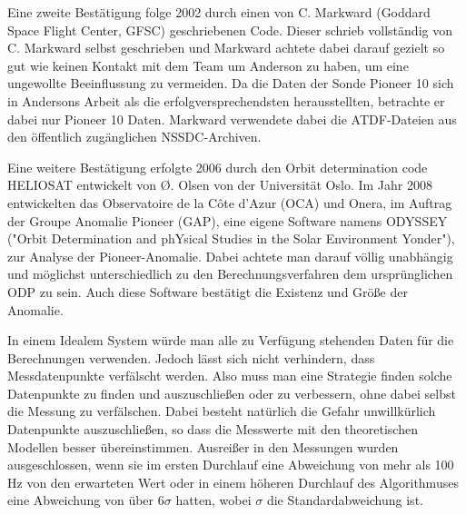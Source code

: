 Eine zweite Bestätigung folge 2002 durch einen von C. Markward (Goddard Space Flight Center, GFSC) geschriebenen
Code. Dieser schrieb vollständig von C. Markward selbst geschrieben und Markward achtete dabei darauf gezielt so gut wie keinen Kontakt mit dem Team um Anderson zu haben, um eine ungewollte Beeinflussung zu vermeiden.\cite{Markwardt2002} Da die Daten der Sonde Pioneer 10 sich in Andersons Arbeit als die erfolgversprechendsten herausstellten, betrachte er dabei nur Pioneer 10 Daten.\cite{Markwardt2002}
Markward verwendete dabei die ATDF-Dateien aus den öffentlich zugänglichen NSSDC-Archiven.

Eine weitere Bestätigung erfolgte 2006 durch den Orbit determination code HELIOSAT entwickelt von Ø. Olsen von der
Universität Oslo.
Im Jahr 2008 entwickelten das Observatoire de la Côte d’Azur (OCA) und Onera, im Auftrag der Groupe Anomalie Pioneer (GAP),
eine eigene Software namens ODYSSEY ("Orbit Determination and phYsical Studies in the Solar Environment Yonder"), zur Analyse der Pioneer-Anomalie.
Dabei achtete man darauf völlig unabhängig und möglichst unterschiedlich zu den Berechnungsverfahren dem ursprünglichen ODP zu sein. 
Auch diese Software bestätigt die Existenz und Größe der Anomalie.\cite{Levy2008}


In einem Idealem System würde man alle zu Verfügung stehenden Daten für die Berechnungen verwenden. Jedoch lässt sich nicht verhindern, dass Messdatenpunkte verfälscht werden. Also muss man eine Strategie finden solche Datenpunkte zu finden und auszuschließen oder zu verbessern, ohne dabei selbst die Messung zu verfälschen. Dabei besteht natürlich die Gefahr unwillkürlich Datenpunkte auszuschließen, so dass die Messwerte mit den theoretischen Modellen besser übereinstimmen.
Ausreißer in den Messungen wurden ausgeschlossen, wenn sie im ersten Durchlauf eine Abweichung von mehr als 100 Hz von den erwarteten Wert oder in einem höheren Durchlauf des Algorithmuses eine Abweichung von über $6\sigma$ hatten, wobei $\sigma$ die Standardabweichung ist.\cite{Levy2008} %
